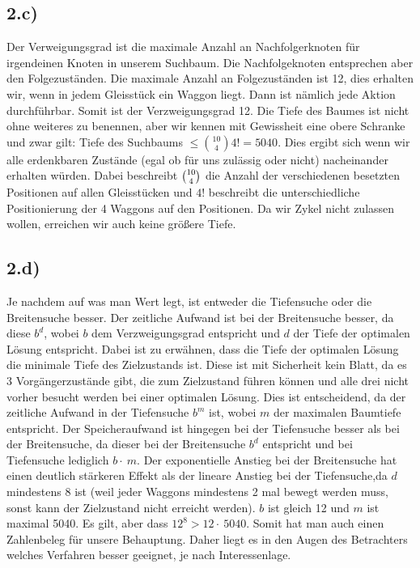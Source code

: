 \documentclass[a4paper]{article}
\begin{document}
\subsection*{2.c)}
Der Verweigungsgrad ist die maximale Anzahl an Nachfolgerknoten f\"ur irgendeinen Knoten in unserem Suchbaum. Die Nachfolgeknoten entsprechen aber den Folgezust\"anden. Die maximale Anzahl an Folgezust\"anden ist 12, dies erhalten wir, wenn in jedem Gleisst\"uck ein Waggon liegt. Dann ist n\"amlich jede Aktion durchf\"uhrbar. Somit ist der Verzweigungsgrad 12.
Die Tiefe des Baumes ist nicht ohne weiteres zu benennen, aber wir kennen mit Gewissheit eine obere Schranke und zwar gilt: Tiefe des Suchbaums $\le \binom{10}{4} 4! = 5040$. Dies ergibt sich wenn wir alle erdenkbaren Zust\"ande (egal ob f\"ur uns zul\"assig oder nicht) nacheinander erhalten würden. Dabei beschreibt $\tbinom{10}{4}$ die Anzahl der verschiedenen besetzten Positionen auf allen Gleisst\"ucken und $4!$ beschreibt die unterschiedliche Positionierung der 4 Waggons auf den Positionen. Da wir Zykel nicht zulassen wollen, erreichen wir auch keine gr\"o{\ss}ere Tiefe.

\subsection*{2.d)}
Je nachdem auf was man Wert legt, ist entweder die Tiefensuche oder die Breitensuche besser. Der zeitliche Aufwand ist bei der Breitensuche besser, da diese $b^d$, wobei $b$ dem Verzweigungsgrad entspricht und $d$ der Tiefe der optimalen L\"osung entspricht. Dabei ist zu erw\"ahnen, dass die Tiefe der optimalen L\"osung die minimale Tiefe des Zielzustands ist. Diese ist mit Sicherheit kein Blatt, da es 3 Vorg\"angerzust\"ande gibt, die zum Zielzustand f\"uhren k\"onnen und alle drei nicht vorher besucht werden bei einer optimalen L\"osung.
Dies ist entscheidend, da der zeitliche Aufwand in der Tiefensuche $b^m$ ist, wobei $m$ der maximalen Baumtiefe entspricht. 
Der Speicheraufwand ist hingegen bei der Tiefensuche besser als bei der Breitensuche, da dieser bei der Breitensuche $b^d$ entspricht und bei Tiefensuche lediglich $b \cdot\ m$. Der exponentielle Anstieg bei der Breitensuche hat einen deutlich st\"arkeren Effekt als der lineare Anstieg bei der Tiefensuche,da $d$ mindestens 8 ist (weil jeder Waggons mindestens 2 mal bewegt werden muss, sonst kann der Zielzustand nicht erreicht werden). $b$ ist gleich 12 und $m$ ist maximal 5040.
Es gilt, aber dass $12^8 > 12 \cdot\ 5040$. Somit hat man auch einen Zahlenbeleg f\"ur unsere Behauptung.
Daher liegt es in den Augen des Betrachters welches Verfahren besser geeignet, je nach Interessenlage.
\end{document}
